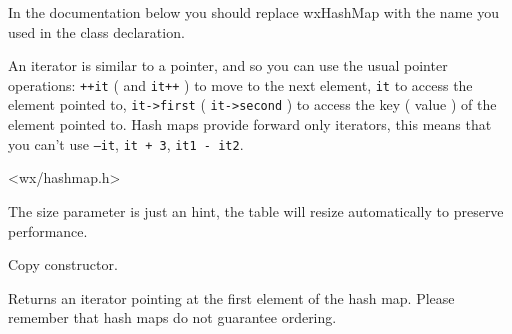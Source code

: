 
In the documentation below you should replace wxHashMap with the name
you used in the class declaration.

\begin{twocollist}
\end{twocollist}


An iterator is similar to a pointer, and so you can use the usual pointer
operations: {\tt ++it} ( and {\tt it++} ) to move to the next element,
{\tt *it} to access the element pointed to, {\tt it->first}
( {\tt it->second} ) to access the key ( value )
of the element pointed to. Hash maps provide forward only iterators, this
means that you can't use {\tt --it}, {\tt it + 3}, {\tt it1 - it2}.


<wx/hashmap.h>




The size parameter is just an hint, the table will resize automatically
to preserve performance.


Copy constructor.




Returns an iterator pointing at the first element of the hash map.
Please remember that hash maps do not guarantee ordering.



